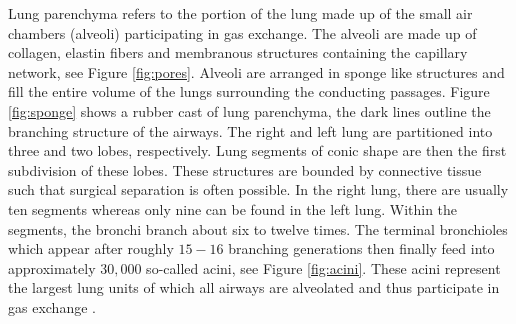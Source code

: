  Lung parenchyma refers to the portion of the lung made up of the small air chambers (alveoli) participating in gas exchange. The alveoli are made up of collagen, elastin fibers and membranous structures containing the capillary network, see Figure \ref{fig:pores}. Alveoli are arranged in sponge like structures and fill the entire volume of the lungs surrounding the conducting passages. Figure \ref{fig:sponge} shows a rubber cast of lung parenchyma, the dark lines outline the branching structure of the airways.
The right and left lung are partitioned into three and two lobes, respectively. Lung segments of conic shape are then the first subdivision of these lobes. These structures are bounded by connective tissue such that surgical separation is often possible. In the right lung, there are usually ten segments whereas only nine can be found in the left lung. Within the segments, the bronchi branch about six to twelve times. The terminal bronchioles which appear after roughly $15-16$ branching generations then finally feed into approximately $30,000$ so-called acini, see Figure \ref{fig:acini}. These acini represent the largest lung units of which all airways are alveolated and thus participate in gas exchange \cite{WeichertThesis}.
%
%
